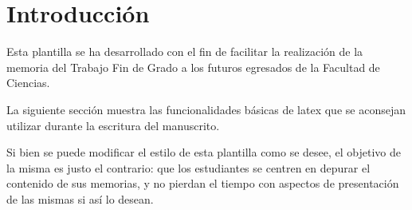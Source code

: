 \section{Introducción}

Esta plantilla se ha desarrollado con el fin de facilitar la realización de la memoria del Trabajo Fin de Grado a los futuros egresados de la Facultad de Ciencias.

La siguiente sección muestra las funcionalidades básicas de latex que se aconsejan utilizar durante la escritura del manuscrito.

Si bien se puede modificar el estilo de esta plantilla como se desee, el objetivo de la misma es justo el contrario: que los estudiantes se centren en depurar el contenido de sus memorias, y no pierdan el tiempo con aspectos de presentación de las mismas si así lo desean.
